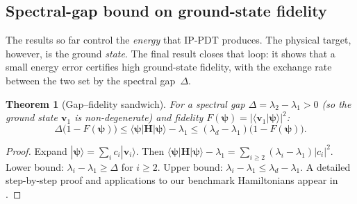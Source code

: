 \documentclass[11pt]{article}
\newtheorem{theorem}{Theorem}[section]
\theoremstyle{plain}
\theoremstyle{plain}
\begin{document}
\subsection{Spectral-gap bound on ground-state fidelity}
\label{sec:gap_fidelity}
The results so far control the \emph{energy} that IP-PDT produces.  The
physical target, however, is the ground \emph{state}.  The final result
closes that loop: it shows that a small energy error certifies high
ground-state fidelity, with the exchange rate between the two set by the
spectral gap~$\Delta$.
\begin{theorem}[Gap--fidelity sandwich]\label{thm:gap_fidelity}
  For a spectral gap $\Delta=\lambda_2-\lambda_1>0$ (so the ground state
  $\mathbf{v}_1$ is non-degenerate) and fidelity
  $F(\boldsymbol{\psi})=|\langle \mathbf{v}_1|\boldsymbol{\psi}\rangle|^2$:
  \begin{equation}\label{eq:sandwich}
    \Delta\bigl(1-F(\boldsymbol{\psi})\bigr)
    \le\langle\boldsymbol{\psi}|\mathbf{H}|\boldsymbol{\psi}\rangle-\lambda_1
    \le(\lambda_d-\lambda_1)\bigl(1-F(\boldsymbol{\psi})\bigr).
  \end{equation}
\end{theorem}
\begin{proof}
Expand $|\boldsymbol{\psi}\rangle=\sum_i c_i|\mathbf{v}_i\rangle$.
Then $\langle\boldsymbol{\psi}|\mathbf{H}|\boldsymbol{\psi}\rangle-\lambda_1
=\sum_{i\ge 2}(\lambda_i-\lambda_1)|c_i|^2$.
Lower bound: $\lambda_i-\lambda_1\ge\Delta$ for $i\ge 2$.
Upper bound: $\lambda_i-\lambda_1\le\lambda_d-\lambda_1$.
A detailed step-by-step proof and applications to our benchmark
Hamiltonians appear in .
\end{proof}
\end{document}
